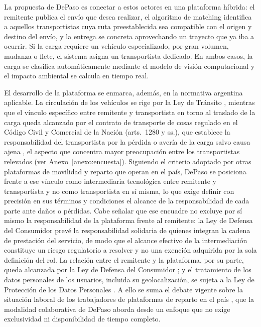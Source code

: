 La propuesta de DePaso es conectar a estos actores en una plataforma híbrida: el remitente publica el envío que desea realizar, el algoritmo de matching identifica a aquellos transportistas cuya ruta preestablecida sea compatible con el origen y destino del envío, y la entrega se concreta aprovechando un trayecto que ya iba a ocurrir. Si la carga requiere un vehículo especializado, por gran volumen, mudanza o flete, el sistema asigna un transportista dedicado. En ambos casos, la carga se clasifica automáticamente mediante el modelo de visión computacional y el impacto ambiental se calcula en tiempo real.

{\color{nuevo}El desarrollo de la plataforma se enmarca, además, en la normativa argentina aplicable. La circulación de los vehículos se rige por la Ley de Tránsito \parencite{LeyTransito24449}, mientras que el vínculo específico entre remitente y transportista en torno al traslado de la carga queda alcanzado por el contrato de transporte de cosas regulado en el Código Civil y Comercial de la Nación (arts.\ 1280 y ss.), que establece la responsabilidad del transportista por la pérdida o avería de la carga salvo causa ajena \parencite{CCyC2014}, el aspecto que concentra mayor preocupación entre los transportistas relevados (ver Anexo~\ref{anexo:encuesta}). Siguiendo el criterio adoptado por otras plataformas de movilidad y reparto que operan en el país, DePaso se posiciona frente a ese vínculo como intermediaria tecnológica entre remitente y transportista y no como transportista en sí misma, lo que exige definir con precisión en sus términos y condiciones el alcance de la responsabilidad de cada parte ante daños o pérdidas. Cabe señalar que ese encuadre no excluye por sí mismo la responsabilidad de la plataforma frente al remitente: la Ley de Defensa del Consumidor prevé la responsabilidad solidaria de quienes integran la cadena de prestación del servicio, de modo que el alcance efectivo de la intermediación constituye un riesgo regulatorio a resolver y no una exención adquirida por la sola definición del rol. La relación entre el remitente y la plataforma, por su parte, queda alcanzada por la Ley de Defensa del Consumidor \parencite{LeyConsumidor24240}; y el tratamiento de los datos personales de los usuarios, incluida su geolocalización, se sujeta a la Ley de Protección de los Datos Personales \parencite{LeyDatosPersonales25326}. A ello se suma el debate vigente sobre la situación laboral de los trabajadores de plataformas de reparto en el país \parencite{OIT2020}, que la modalidad colaborativa de DePaso aborda desde un enfoque que no exige exclusividad ni disponibilidad de tiempo completo.}

